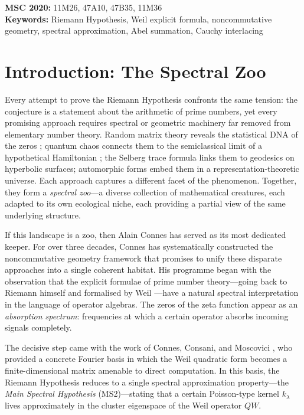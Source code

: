 \documentclass[12pt,a4paper]{article}
\theoremstyle{definition}
\theoremstyle{remark}
\begin{document}
\noindent\textbf{MSC 2020:} 11M26, 47A10, 47B35, 11M36\\
\textbf{Keywords:} Riemann Hypothesis, Weil explicit formula, noncommutative geometry,
spectral approximation, Abel summation, Cauchy interlacing

\newpage
\tableofcontents
\newpage

\section{Introduction: The Spectral Zoo}
\label{sec:intro}

Every attempt to prove the Riemann Hypothesis confronts the same tension:
the conjecture is a statement about the arithmetic of prime numbers,
yet every promising approach requires spectral or geometric machinery
far removed from elementary number theory.
Random matrix theory reveals the statistical DNA of the zeros
\cite{Montgomery1973,Odlyzko1987};
quantum chaos connects them to the semiclassical limit of a
hypothetical Hamiltonian \cite{BerryKeating1999};
the Selberg trace formula links them to geodesics on hyperbolic surfaces;
automorphic forms embed them in a representation-theoretic universe.
Each approach captures a different facet of the phenomenon.
Together, they form a \emph{spectral zoo}---a diverse collection of
mathematical creatures, each adapted to its own ecological niche,
each providing a partial view of the same underlying structure.

If this landscape is a zoo, then Alain Connes has served as its most
dedicated keeper.
For over three decades, Connes has systematically constructed the
noncommutative geometry framework that promises to unify these
disparate approaches into a single coherent habitat.
His programme began with the observation that the explicit formulae of
prime number theory---going back to Riemann himself and formalised by
Weil \cite{Weil1952}---have a natural spectral interpretation in the
language of operator algebras.
The zeros of the zeta function appear as an \emph{absorption spectrum}:
frequencies at which a certain operator absorbs incoming signals completely.

The decisive step came with the work of Connes, Consani, and Moscovici
\cite{CCM2025}, who provided a concrete Fourier basis
in which the Weil quadratic form becomes a finite-dimensional matrix
amenable to direct computation.
In this basis, the Riemann Hypothesis reduces to a single spectral
approximation property---the \emph{Main Spectral Hypothesis} (MS2)---stating
that a certain Poisson-type kernel $k_\lambda$ lives approximately
in the cluster eigenspace of the Weil operator $QW$.
\end{document}
